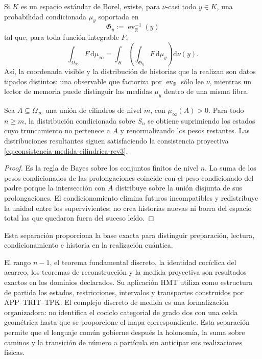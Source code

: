\begin{proposition}
\label{prop:desintegracion-valores-genealogicos-rev3}
Si \(K\) es un espacio estándar de Borel, existe, para \(\nu\)-casi todo
\(y\in K\), una probabilidad condicionada \(\mu_y\) soportada en
\[
 \mathfrak G_y:=\operatorname{ev}_{\mathbb R}^{-1}(y)
\]
tal que, para toda función integrable \(F\),
\begin{equation}
 \int_{\Omega_\infty}F\,\mathrm d\mu_\infty
 =\int_K
   \left(\int_{\mathfrak G_y}F\,\mathrm d\mu_y\right)
   \mathrm d\nu(y).
 \label{eq:desintegracion-fibras-visibles-rev3}
\end{equation}
Así, la coordenada visible y la distribución de historias que la realizan
son datos tipados distintos: una observable que factoriza por
\(\operatorname{ev}_{\mathbb R}\) sólo lee \(\nu\), mientras un lector de
memoria puede distinguir las medidas \(\mu_y\) dentro de una misma fibra.
\end{proposition}

\begin{proposition}
\label{prop:condicionamiento-cilindrico-compatible-rev3}
Sea \(A\subseteq\Omega_\infty\) una unión de cilindros de nivel \(m\), con
\(\mu_\infty(A)>0\). Para todo \(n\geq m\), la distribución condicionada
sobre \(S_n\) se obtiene suprimiendo los estados cuyo truncamiento no
pertenece a \(A\) y renormalizando los pesos restantes. Las distribuciones
resultantes siguen satisfaciendo la consistencia proyectiva
\eqref{eq:consistencia-medida-cilindrica-rev3}.
\end{proposition}

\begin{proof}
Es la regla de Bayes sobre los conjuntos finitos de nivel \(n\). La suma de
los pesos condicionados de las prolongaciones coincide con el peso condicionado del
padre porque la intersección con \(A\) distribuye sobre la unión disjunta de
sus prolongaciones. El condicionamiento elimina futuros incompatibles y
redistribuye la unidad entre los supervivientes; no crea historias nuevas ni
borra del espacio total las que quedaron fuera del suceso leído.
\end{proof}

Esta separación proporciona la base exacta para distinguir preparación,
lectura, condicionamiento e historia en la realización cuántica.

\begin{statusbox}[title={Fuerza matemática y función arquitectónica}]
El rango \(n-1\), el teorema fundamental discreto, la identidad cocíclica del
acarreo, los teoremas de reconstrucción y la medida proyectiva son resultados
exactos en los dominios declarados. Su aplicación HMT utiliza como estructura de partida los estados,
restricciones, intervalos y transportes construidos por APP--TRIT--TPK. El
complejo discreto de medida es una formalización organizadora: no identifica
el cociclo categorial de grado dos con una celda geométrica hasta que se
proporcione el mapa correspondiente. Esta separación permite que el lenguaje
común gobierne después la holonomía, la suma sobre caminos y la transición de
número a partícula sin anticipar sus realizaciones físicas.
\end{statusbox}

